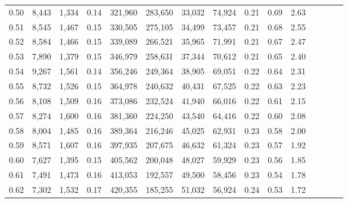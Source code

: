 \begin{tabular}{rrrcrrrrrrrrrrr}
0.50 &   8,443 &  1,334 &                                       0.14 &  321,960 &  283,650 &   33,032 &   74,924 &  0.21 &  0.69 &                         2.63 \\
0.51 &   8,545 &  1,467 &                                       0.15 &  330,505 &  275,105 &   34,499 &   73,457 &  0.21 &  0.68 &                         2.55 \\
0.52 &   8,584 &  1,466 &                                       0.15 &  339,089 &  266,521 &   35,965 &   71,991 &  0.21 &  0.67 &                         2.47 \\
0.53 &   7,890 &  1,379 &                                       0.15 &  346,979 &  258,631 &   37,344 &   70,612 &  0.21 &  0.65 &                         2.40 \\
0.54 &   9,267 &  1,561 &                                       0.14 &  356,246 &  249,364 &   38,905 &   69,051 &  0.22 &  0.64 &                         2.31 \\
0.55 &   8,732 &  1,526 &                                       0.15 &  364,978 &  240,632 &   40,431 &   67,525 &  0.22 &  0.63 &                         2.23 \\
0.56 &   8,108 &  1,509 &                                       0.16 &  373,086 &  232,524 &   41,940 &   66,016 &  0.22 &  0.61 &                         2.15 \\
0.57 &   8,274 &  1,600 &                                       0.16 &  381,360 &  224,250 &   43,540 &   64,416 &  0.22 &  0.60 &                         2.08 \\
0.58 &   8,004 &  1,485 &                                       0.16 &  389,364 &  216,246 &   45,025 &   62,931 &  0.23 &  0.58 &                         2.00 \\
0.59 &   8,571 &  1,607 &                                       0.16 &  397,935 &  207,675 &   46,632 &   61,324 &  0.23 &  0.57 &                         1.92 \\
0.60 &   7,627 &  1,395 &                                       0.15 &  405,562 &  200,048 &   48,027 &   59,929 &  0.23 &  0.56 &                         1.85 \\
0.61 &   7,491 &  1,473 &                                       0.16 &  413,053 &  192,557 &   49,500 &   58,456 &  0.23 &  0.54 &                         1.78 \\
0.62 &   7,302 &  1,532 &                                       0.17 &  420,355 &  185,255 &   51,032 &   56,924 &  0.24 &  0.53 &                         1.72 \\

\end{tabular}
